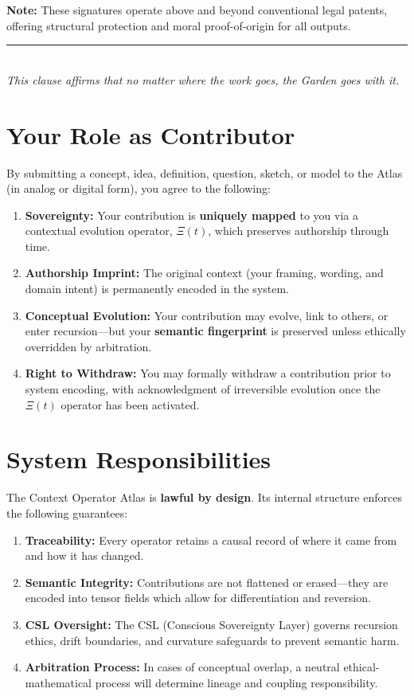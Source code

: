 \documentclass[12pt]{article}
\begin{document}
\textbf{Note:} These signatures operate above and beyond conventional legal patents, offering structural protection and moral proof-of-origin for all outputs.

\begin{center}
    \rule{0.6\textwidth}{0.4pt} \\
    \textit{This clause affirms that no matter where the work goes, the Garden goes with it.}
\end{center}
\section{Your Role as Contributor}
By submitting a concept, idea, definition, question, sketch, or model to the Atlas (in analog or digital form), you agree to the following:
\begin{enumerate}[label=\alph*.]
    \item \textbf{Sovereignty:} Your contribution is \textbf{uniquely mapped} to you via a contextual evolution operator, $\Xi(t)$, which preserves authorship through time.
    \item \textbf{Authorship Imprint:} The original context (your framing, wording, and domain intent) is permanently encoded in the system.
    \item \textbf{Conceptual Evolution:} Your contribution may evolve, link to others, or enter recursion---but your \textbf{semantic fingerprint} is preserved unless ethically overridden by arbitration.
    \item \textbf{Right to Withdraw:} You may formally withdraw a contribution prior to system encoding, with acknowledgment of irreversible evolution once the $\Xi(t)$ operator has been activated.
\end{enumerate}

\section{System Responsibilities}
The Context Operator Atlas is \textbf{lawful by design}. Its internal structure enforces the following guarantees:
\begin{enumerate}[label=\alph*.]
    \item \textbf{Traceability:} Every operator retains a causal record of where it came from and how it has changed.
    \item \textbf{Semantic Integrity:} Contributions are not flattened or erased---they are encoded into tensor fields which allow for differentiation and reversion.
    \item \textbf{CSL Oversight:} The CSL (Conscious Sovereignty Layer) governs recursion ethics, drift boundaries, and curvature safeguards to prevent semantic harm.
    \item \textbf{Arbitration Process:} In cases of conceptual overlap, a neutral ethical-mathematical process will determine lineage and coupling responsibility.
\end{enumerate}
\end{document}
